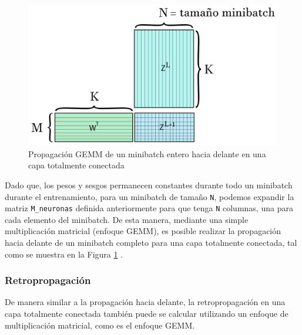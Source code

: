 \begin{figure}[H]
	\centering
	\includegraphics[scale=0.25]{imagenes/gemm_fully_forward_minibatch.jpg}  
	\caption{Propagación GEMM de un minibatch entero hacia delante en una capa totalmente conectada}
	\label{fig:gemm_fully_forward_minibatch}
\end{figure}

Dado que, los pesos y sesgos permanecen constantes durante todo un minibatch durante el entrenamiento, para un minibatch de tamaño \texttt{N}, podemos expandir la matriz \texttt{M\_neuronas} definida anteriormente para que tenga \texttt{N} columnas, una para cada elemento del minibatch. De esta manera, mediante una simple multiplicación matricial (enfoque GEMM), es posible realizar la propagación hacia delante de un minibatch completo para una capa totalmente conectada, tal como se muestra en la Figura \ref{fig:gemm_fully_forward_minibatch} \cite{nvidia_back_fully_GEMM}.

\newpage

\subsubsection{Retropropagación}

De manera similar a la propagación hacia delante, la retropropagación en una capa totalmente conectada también puede se calcular utilizando un enfoque de multiplicación matricial, como es el enfoque GEMM.

